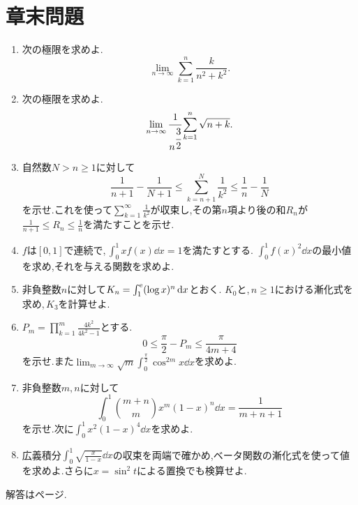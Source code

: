 \section*{章末問題}
\begin{enumerate}[label=\textbf{\thechapter.\arabic*},leftmargin=*]
 \item\label{問:区分求積分子が添字}
 次の極限を求めよ.
 \[
  \lim_{n\to\infty}\sum_{k=1}^{n}\frac{k}{n^2+k^2}.
 \]
 \item\label{問:区分求積根号}
 次の極限を求めよ.
 \[
  \lim_{n\to\infty}\cfrac1{n^{\cfrac32}}
      \sum_{k=1}^{n}\sqrt{n+k}.
 \]
 \item\label{問:逆平方和の残り}
 自然数$N>n\ge1$に対して
 \[
  \frac1{n+1}-\frac1{N+1}
  \le\sum_{k=n+1}^{N}\frac1{k^2}
  \le\frac1n-\frac1N
 \]
 を示せ.これを使って$\sum_{k=1}^{\infty}\frac1{k^2}$が収束し,その第$n$項より後の和$R_n$が
 $\frac1{n+1}\le R_n\le\frac1n$を満たすことを示せ.
 \item\label{問:積分制約と二乗}
 $f$は$[0,1]$で連続で,\,$\int_0^1xf(x)\dd x=1$を満たすとする.
 $\int_0^1f(x)^2\dd x$の最小値を求め,それを与える関数を求めよ.
 \item\label{問:対数の積分漸化式}
 非負整数$n$に対して$K_n=\int_1^{\mathrm{e}}(\log x)^n\,\mathrm{d} x$とおく.
 $K_0$と,\,$n\ge1$における漸化式を求め,\,$K_3$を計算せよ.
 \item\label{問:ウォリス積の誤差}
 $P_m=\prod_{k=1}^{m}\frac{4k^2}{4k^2-1}$とする.
 \[
 0\le\frac{\pi}{2}-P_m\le\frac{\pi}{4m+4}
 \]
 を示せ.また$\lim_{m\to\infty}\sqrt m\int_0^{\frac{\pi}{2}}\cos^{2m}x\dd x$を求めよ.
 \item\label{問:整数ベータ二項係数}
 非負整数$m,n$に対して
 \[
 \int_0^1\binom{m+n}{m}x^m(1-x)^n\dd x=\frac1{m+n+1}
 \]
 を示せ.次に$\int_0^1x^2(1-x)^4\dd x$を求めよ.
 \item\label{問:半整数ベータ}
 広義積分$\int_0^1\sqrt{\frac{x}{1-x}}\dd x$の収束を両端で確かめ,ベータ関数の漸化式を使って値を求めよ.さらに$x=\sin^2t$による置換でも検算せよ.
\end{enumerate}

\smallskip\noindent 解答は\pageref{解答:第10章}ページ.

